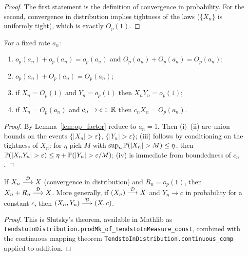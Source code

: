 \begin{proof}
The first statement is the definition of convergence in probability. For the
second, convergence in distribution implies tightness of the laws
($\{X_n\}$ is uniformly tight), which is exactly $O_p(1)$.
\end{proof}

\begin{lemma}\label{lem:op_arith}
\leanok
{}
For a fixed rate $a_n$:
\begin{enumerate}
  \item[(i)] $o_p(a_n) + o_p(a_n) = o_p(a_n)$ and $O_p(a_n) + O_p(a_n) = O_p(a_n)$;
  \item[(ii)] $o_p(a_n) + O_p(a_n) = O_p(a_n)$;
  \item[(iii)] if $X_n = O_p(1)$ and $Y_n = o_p(1)$ then $X_n Y_n = o_p(1)$;
  \item[(iv)] if $X_n = O_p(a_n)$ and $c_n \to c \in \mathbb{R}$ then $c_n X_n = O_p(a_n)$.
\end{enumerate}
\end{lemma}

\begin{proof}\leanok
{}
By Lemma~\ref{lem:op_factor} reduce to $a_n = 1$. Then (i)--(ii) are union bounds
on the events $\{|X_n| > \varepsilon\}$, $\{|Y_n| > \varepsilon\}$; (iii) follows
by conditioning on the tightness of $X_n$: for $\eta$ pick $M$ with
$\sup_n \Prob(|X_n|>M)\le\eta$, then $\Prob(|X_nY_n|>\varepsilon)\le\eta
+\Prob(|Y_n|>\varepsilon/M)$; (iv) is immediate from boundedness of $c_n$.
\end{proof}

\begin{lemma}\label{lem:op_slutsky}
If $X_n \overset{\mathcal{D}}{\longrightarrow} X$ (convergence in distribution) and $R_n = o_p(1)$, then
$X_n + R_n \overset{\mathcal{D}}{\longrightarrow} X$. More generally, if $(X_n) \overset{\mathcal{D}}{\longrightarrow} X$ and $Y_n \to c$ in
probability for a constant $c$, then $(X_n, Y_n) \overset{\mathcal{D}}{\longrightarrow} (X, c)$.
\end{lemma}

\begin{proof}
This is Slutsky's theorem, available in Mathlib as
\texttt{TendstoInDistribution.prodMk\_of\_tendstoInMeasure\_const}, combined with
the continuous mapping theorem \texttt{TendstoInDistribution.continuous\_comp}
applied to addition.
\end{proof}

